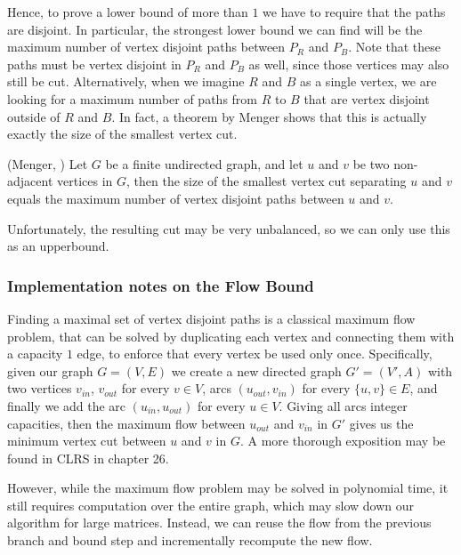 	Hence, to prove a lower bound of more than $1$ we have to require that the
	paths are disjoint. In particular, the
	strongest lower bound we can find will be the maximum number of vertex
	disjoint paths between $P_R$ and $P_B$. Note that these paths must be
	vertex disjoint in $P_R$ and $P_B$ as well, since those vertices may also
	still be cut. Alternatively, when we imagine $R$ and $B$ as a single
	vertex, we are looking for a maximum number of paths from $R$ to $B$ that
	are vertex disjoint outside of $R$ and $B$. In fact, a theorem by Menger
	shows that this is actually exactly the size of the smallest vertex cut.

	\begin{theorem}{(Menger, \cite{})}
		Let $G$ be a finite undirected graph, and let $u$ and $v$ be two
		non-adjacent vertices in $G$, then the size of the smallest vertex cut
		separating $u$ and $v$ equals the maximum number of vertex disjoint
		paths between $u$ and $v$.
	\end{theorem}

	Unfortunately, the resulting cut may be very unbalanced, so we can only
	use this as an upperbound.

	\subsubsection{Implementation notes on the Flow Bound}

	Finding a maximal set of vertex disjoint paths is a classical maximum flow
	problem, that can be solved by duplicating each vertex and connecting them
	with a capacity $1$ edge, to enforce that every vertex be used only once.
	Specifically, given our graph $G = (V, E)$ we create
	a new directed graph $G' = (V', A)$ with two vertices $v_{in}$, $v_{out}$
	for every $v \in V$, arcs $(u_{out}, v_{in})$ for every $\{u, v\} \in E$,
	and finally we add the arc $(u_{in}, u_{out})$ for every $u \in V$.
	Giving all arcs integer capacities, then the maximum flow between
	$u_{out}$ and $v_{in}$ in $G'$ gives us the minimum vertex cut between
	$u$ and $v$ in $G$.
	A more thorough exposition may be found in \cite{} CLRS
	in chapter 26.

	However, while the maximum flow problem may be solved in polynomial time,
	it still requires computation over the entire graph, which may slow down
	our algorithm for large matrices. Instead, we can reuse the flow from the
	previous branch and bound step and incrementally recompute the new flow.

